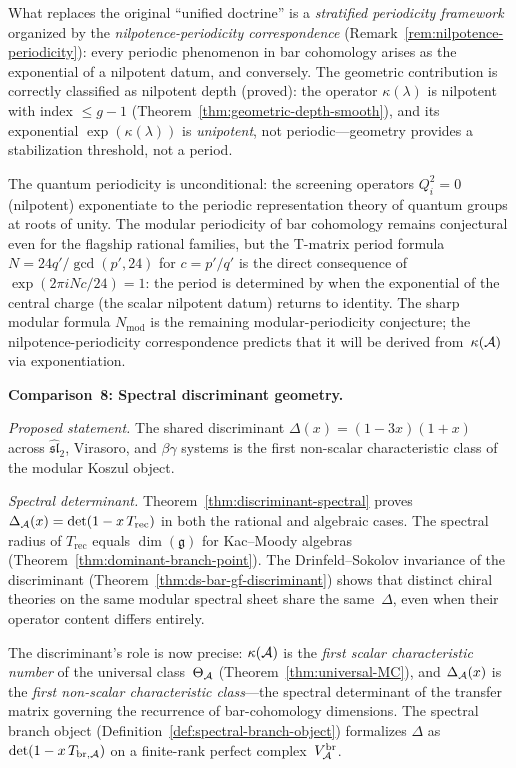 What replaces the original ``unified doctrine'' is a
\emph{stratified periodicity framework} organized by the
\emph{nilpotence-periodicity correspondence}
(Remark~\ref{rem:nilpotence-periodicity}): every periodic phenomenon
in bar cohomology arises as the exponential of a nilpotent datum, and
conversely.  The geometric contribution is correctly classified as
nilpotent depth (proved): the operator $\kappa(\lambda)$ is nilpotent
with index $\leq g-1$ (Theorem~\ref{thm:geometric-depth-smooth}),
and its exponential $\exp(\kappa(\lambda))$ is \emph{unipotent}, not
periodic---geometry provides a stabilization threshold, not a period.

The quantum periodicity is unconditional: the screening operators
$Q_i^2 = 0$ (nilpotent) exponentiate to the periodic representation
theory of quantum groups at roots of unity.  The modular periodicity
of bar cohomology remains conjectural even for the flagship rational
families, but the T-matrix period formula
$N = 24q'/\gcd(p',24)$ for $c = p'/q'$ is the direct consequence of
$\exp(2\pi i N c/24) = 1$: the period is determined by when the
exponential of the central charge (the scalar nilpotent datum) returns
to identity.  The sharp modular formula $N_{\mathrm{mod}}$ is the
remaining modular-periodicity conjecture; the
nilpotence-periodicity correspondence predicts that it will be
derived from~$\kappa(\mathcal{A})$ via exponentiation.

\medskip

\noindent\textbf{Comparison~8: Spectral discriminant geometry.}

\emph{Proposed statement.}
The shared discriminant $\Delta(x) = (1-3x)(1+x)$ across
$\widehat{\mathfrak{sl}}_2$, Virasoro, and $\beta\gamma$ systems
is the first non-scalar characteristic class of the modular
Koszul object.

\emph{Spectral determinant.}
Theorem~\ref{thm:discriminant-spectral} proves
$\Delta_{\mathcal{A}}(x) = \det(1 - x\, T_{\mathrm{rec}})$ in both the
rational and algebraic cases.  The spectral radius of
$T_{\mathrm{rec}}$ equals $\dim(\mathfrak{g})$ for Kac--Moody
algebras (Theorem~\ref{thm:dominant-branch-point}).  The
Drinfeld--Sokolov invariance of the discriminant
(Theorem~\ref{thm:ds-bar-gf-discriminant}) shows that distinct
chiral theories on the same modular spectral sheet share the
same~$\Delta$, even when their operator content differs entirely.

The discriminant's role is now precise: $\kappa(\mathcal{A})$ is the
\emph{first scalar characteristic number} of the universal
class~$\Theta_{\mathcal{A}}$ (Theorem~\ref{thm:universal-MC}), and $\Delta_{\mathcal{A}}(x)$ is the \emph{first
non-scalar characteristic class}---the spectral determinant of
the transfer matrix governing the recurrence of bar-cohomology
dimensions.  The spectral branch object
(Definition~\ref{def:spectral-branch-object}) formalizes $\Delta$
as $\det(1 - x\, T_{\mathrm{br},\mathcal{A}})$ on a finite-rank perfect
complex~$V_{\mathcal{A}}^{\mathrm{br}}$.

